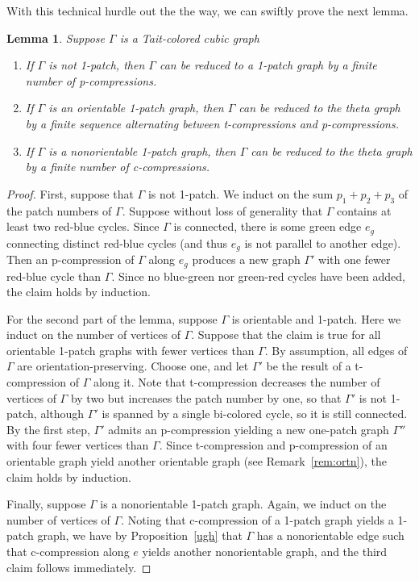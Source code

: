 \documentclass[11pt, oneside]{amsart}
\theoremstyle{theorem}
\newtheorem{lemma}[theorem]{Lemma}
\theoremstyle{definition}
\newcommand{\be}{\begin{enumerate}}
\newcommand{\ee}{\end{enumerate}}
\theoremstyle{theorem}
\begin{document}
With this technical hurdle out the the way, we can swiftly prove the next lemma.

\begin{lemma}\label{totalcomp}
Suppose $\Gamma$ is a Tait-colored cubic graph
\be
\item If $\Gamma$ is not 1-patch, then $\Gamma$ can be reduced to a 1-patch graph by a finite number of p-compressions.
\item If $\Gamma$ is an orientable 1-patch graph, then $\Gamma$ can be reduced to the theta graph by a finite sequence alternating between t-compressions and p-compressions.
\item If $\Gamma$ is a nonorientable 1-patch graph, then $\Gamma$ can be reduced to the theta graph by a finite number of c-compressions.
\ee
\end{lemma}

\begin{proof}
First, suppose that $\Gamma$ is not 1-patch.  We induct on the sum $p_1 + p_2 + p_3$ of the patch numbers of $\Gamma$.  Suppose without loss of generality that $\Gamma$ contains at least two red-blue cycles.  Since $\Gamma$ is connected, there is some green edge $e_g$ connecting distinct red-blue cycles (and thus $e_g$ is not parallel to another edge).  Then an p-compression of $\Gamma$ along $e_g$ produces a new graph $\Gamma'$ with one fewer red-blue cycle than $\Gamma$.  Since no blue-green nor green-red cycles have been added, the claim holds by induction.

For the second part of the lemma, suppose $\Gamma$ is orientable and 1-patch.  Here we induct on the number of vertices of $\Gamma$.  Suppose that the claim is true for all orientable 1-patch graphs with fewer vertices than $\Gamma$.  By assumption, all edges of $\Gamma$ are orientation-preserving.  Choose one, and let $\Gamma'$ be the result of a t-compression of $\Gamma$ along it.  Note that t-compression decreases the number of vertices of $\Gamma$ by two but increases the patch number by one, so that $\Gamma'$ is not 1-patch, although $\Gamma'$ is spanned by a single bi-colored cycle, so it is still connected.  By the first step, $\Gamma'$ admits an p-compression yielding a new one-patch graph $\Gamma''$ with four fewer vertices than $\Gamma$.  Since t-compression and p-compression of an orientable graph yield another orientable graph (see Remark~\ref{rem:ortn}), the claim holds by induction.

Finally, suppose $\Gamma$ is a nonorientable 1-patch graph.  Again, we induct on the number of vertices of $\Gamma$.  Noting that c-compression of a 1-patch graph yields a 1-patch graph, we have by Proposition~\ref{ugh} that $\Gamma$ has a nonorientable edge such that c-compression along $e$ yields another nonorientable graph, and the third claim follows immediately.
\end{proof}
\end{document}
